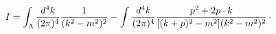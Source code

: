 \begin{equation}
I=\int_{\Lambda }\frac{d^{4}k}{(2\pi )^{4}}\frac{1}{(k^{2}-m^{2})^{2}}-\int 
\frac{d^{4}k}{(2\pi )^{4}}\frac{p^{2}+2p\cdot k}{%
[(k+p)^{2}-m^{2}](k^{2}-m^{2})^{2}}\,\cdot   \label{3}
\end{equation}

